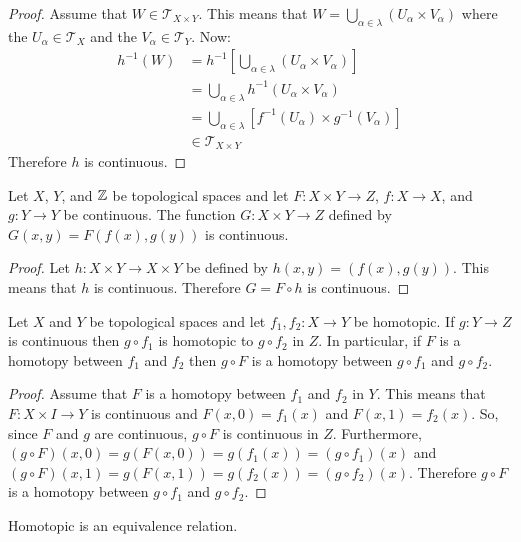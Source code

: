 \documentclass[letterpaper,12pt,fleqn]{article}
\renewcommand{\a}{\alpha}
\renewcommand{\l}{\lambda}
\newcommand{\T}{\mathscr{T}}
\begin{document}
\begin{proof}
  Assume that \(W\in\T_{X\times Y}\).  This means that \(W=\bigcup_{\a\in\l}(U_{\a}\times V_{\a})\) where
  the \(U_{\a}\in\T_X\) and the \(V_{\a}\in\T_Y\).  Now:
  \begin{align*}
    h^{-1}(W) &= h^{-1}\left[\bigcup_{\a\in\l}(U_{\a}\times V_{\a})\right] \\
    &= \bigcup_{\a\in\l}h^{-1}(U_{\a}\times V_{\a}) \\
    &= \bigcup_{\a\in\l}[f^{-1}(U_{\a})\times g^{-1}(V_{\a})] \\
    & \in\T_{X\times Y}
  \end{align*}
  Therefore \(h\) is continuous.
\end{proof}

\begin{corollary}
  Let \(X\), \(Y\), and \(\mathbb{Z}\) be topological spaces and let \(F:X\times Y\to Z\), \(f:X\to X\), and \(g:Y\to Y\)
  be continuous.  The function \(G:X\times Y\to Z\) defined by \(G(x,y)=F(f(x),g(y))\) is continuous.
\end{corollary}

\begin{proof}
  Let \(h:X\times Y\to X\times Y\) be defined by \(h(x,y)=(f(x),g(y))\).  This means that \(h\) is continuous.
  Therefore \(G=F\circ h\) is continuous.
\end{proof}

\begin{corollary}
  Let \(X\) and \(Y\) be topological spaces and let \(f_1,f_2:X\to Y\) be homotopic.  If \(g:Y\to Z\) is
  continuous then \(g\circ f_1\) is homotopic to \(g\circ f_2\) in \(Z\).  In particular, if \(F\) is a homotopy
  between \(f_1\) and \(f_2\) then \(g\circ F\) is a homotopy between \(g\circ f_1\) and \(g\circ f_2\).
\end{corollary}

\begin{proof}
  Assume that \(F\) is a homotopy between \(f_1\) and \(f_2\) in \(Y\).  This means that \(F:X\times I\to Y\) is
  continuous and \(F(x,0)=f_1(x)\) and \(F(x,1)=f_2(x)\).  So, since \(F\) and \(g\) are continuous,
  \(g\circ F\) is continuous in \(Z\).  Furthermore, \((g\circ F)(x,0)=g(F(x,0))=g(f_1(x))=(g\circ f_1)(x)\) and
  \((g\circ F)(x,1)=g(F(x,1))=g(f_2(x))=(g\circ f_2)(x)\).  Therefore \(g\circ F\) is a homotopy between \(g\circ f_1\)
  and \(g\circ f_2\).
\end{proof}

\begin{theorem}
  Homotopic is an equivalence relation.
\end{theorem}
\end{document}

